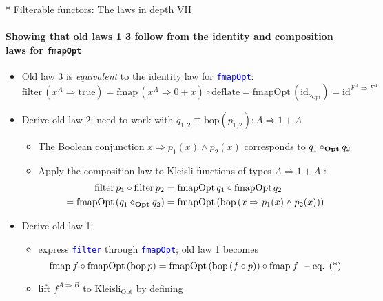 \documentclass[english]{beamer}
\begin{document}
\begin{frame}{{*} Filterable functors: The laws in depth VII}


\framesubtitle{Showing that old laws 1 \textendash{} 3 follow from the identity
and composition laws for \texttt{\footnotesize{}fmapOpt}}
\begin{itemize}
\item Old law 3 is \emph{equivalent} to the identity law for \texttt{\textcolor{blue}{\footnotesize{}fmapOpt}}:{\footnotesize{}
\[
\text{filter}\,(x^{A}\Rightarrow\text{true})=\text{fmap}\,(x^{A}\Rightarrow0+x)\circ\text{deflate}=\text{fmapOpt}\,(\text{id}_{\diamond_{\text{Opt}}})=\text{id}^{F^{A}\Rightarrow F^{A}}
\]
}{\footnotesize \par}
\item Derive old law 2: need to work with{\footnotesize{} $q_{1,2}\equiv\text{bop}\left(p_{1,2}\right):A\Rightarrow1+A$ }{\footnotesize \par}
\begin{itemize}
\item The Boolean conjunction {\footnotesize{}$x\Rightarrow p_{1}(x)\wedge p_{2}(x)$
}corresponds to {\footnotesize{}$q_{1}\diamond_{\text{\textbf{Opt}}}q_{2}$}{\footnotesize \par}
\item Apply the composition law to Kleisli functions of types {\footnotesize{}$A\Rightarrow1+A$
}:{\footnotesize{}
\begin{align*}
\text{filter}\,p_{1}\circ\text{filter}\,p_{2} & =\text{fmapOpt}\,q_{1}\circ\text{fmapOpt}\,q_{2}\\
=\text{fmapOpt}\left(q_{1}\diamond_{\text{\textbf{Opt}}}q_{2}\right) & =\text{fmapOpt}\left(\text{bop}\left(x\Rightarrow p_{1}(x)\wedge p_{2}(x)\right)\right)
\end{align*}
}{\footnotesize \par}
\end{itemize}
\item Derive old law 1:
\begin{itemize}
\item express \texttt{\textcolor{blue}{\footnotesize{}filter}} through \texttt{\textcolor{blue}{\footnotesize{}fmapOpt}};
old law 1 becomes{\footnotesize{}
\[
\text{fmap}\:f\circ\text{fmapOpt}\left(\text{bop}\,p\right)=\text{fmapOpt}\left(\text{bop}\left(f\circ p\right)\right)\circ\text{fmap}\:f\ \text{ \textendash\ eq. (*)}
\]
}{\footnotesize \par}
\item lift $f^{A\Rightarrow B}$ to Kleisli$_{\text{Opt}}$ by defining

\end{itemize}
\end{itemize}
\end{frame}
\end{document}
